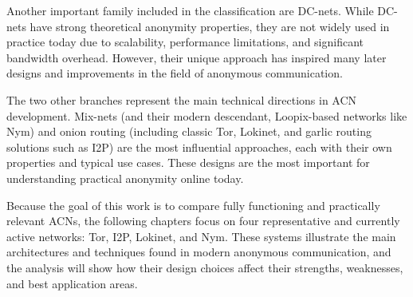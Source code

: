Another important family included in the classification are DC-nets. While DC-nets have strong theoretical anonymity properties, they are not widely used in practice today due to scalability, performance limitations, and significant bandwidth overhead. However, their unique approach has inspired many later designs and improvements in the field of anonymous communication.

The two other branches represent the main technical directions in ACN development. Mix-nets (and their modern descendant, Loopix-based networks like Nym) and onion routing (including classic Tor, Lokinet, and garlic routing solutions such as I2P) are the most influential approaches, each with their own properties and typical use cases. These designs are the most important for understanding practical anonymity online today.

Because the goal of this work is to compare fully functioning and practically relevant ACNs, the following chapters focus on four representative and currently active networks: Tor, I2P, Lokinet, and Nym. These systems illustrate the main architectures and techniques found in modern anonymous communication, and the analysis will show how their design choices affect their strengths, weaknesses, and best application areas.